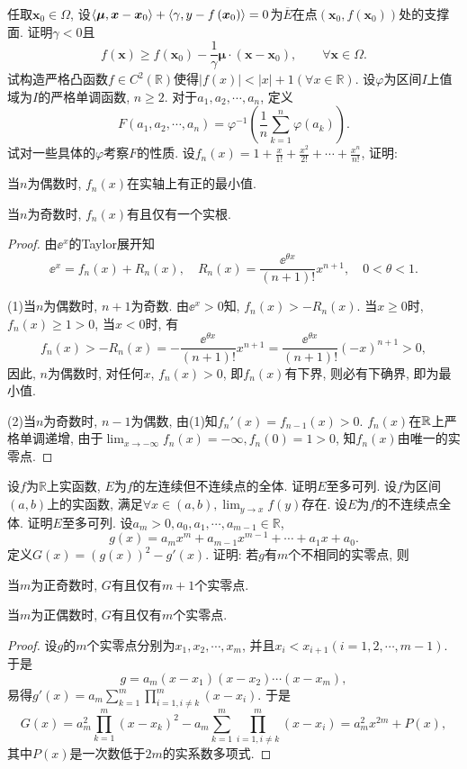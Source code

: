 \begin{quizb}
任取\(\boldsymbol{x}_0\in\varOmega\), 设\(\langle \boldsymbol{\mu},\boldsymbol{x}-\boldsymbol{x}_0 \rangle+\langle \gamma,y-f\left(\boldsymbol{x}_0\right) \rangle=0\)为\(\overline{E}\)在点\((\boldsymbol{x}_0,f\left(\boldsymbol{x}_0\right))\)处的支撑面. 证明\(\gamma<0\)且\[f\left(\boldsymbol{x}\right)\geqslant f\left(\boldsymbol{x}_0\right)-\frac{1}{\gamma}\boldsymbol{\mu}\cdot\left(\boldsymbol{x}-\boldsymbol{x}_0\right),\qquad\forall\boldsymbol{x}\in\varOmega.\]
\woe 试构造严格凸函数\(f\in C^2(\mathbb{R})\)使得\(\left|f(x)\right|<|x|+1\left(\forall x\in\mathbb{R}\right)\).
\woe 设\(\varphi\)为区间\(I\)上值域为\(I\)的严格单调函数, \(n\geqslant 2\). 对于\(a_1,a_2,\cdots,a_n\), 定义\[F(a_1,a_2,\cdots,a_n)=\varphi^{-1}\left(\frac{1}{n}\sum_{k=1}^{n}\varphi(a_k)\right).\]试对一些具体的\(\varphi\)考察\(F\)的性质.
\woe 设\(f_n(x)=1+\frac{x}{1!}+\frac{x^2}{2!}+\cdots+\frac{x^n}{n!}\), 证明:\begin{quizs}
\item 当\(n\)为偶数时, \(f_n(x)\)在实轴上有正的最小值.
\item 当\(n\)为奇数时, \(f_n(x)\)有且仅有一个实根.
\end{quizs}
\begin{proof}
由\(\ee^x\)的Taylor展开知\[\ee^x=f_n(x)+R_n(x),\quad R_n(x)=\frac{\ee^{\theta x}}{(n+1)!}x^{n+1},\quad 0<\theta<1.\]

(1)当\(n\)为偶数时, \(n+1\)为奇数. 由\(\ee^x>0\)知, \(f_n(x)>-R_n(x)\). 当\(x\geqslant 0\)时, \(f_n(x)\geqslant 1>0\), 当\(x<0\)时, 有\[f_n(x)>-R_n(x)=-\frac{\ee^{\theta x}}{(n+1)!}x^{n+1}=\frac{\ee^{\theta x}}{(n+1)!}(-x)^{n+1}>0,\]因此, \(n\)为偶数时, 对任何\(x\), \(f_n(x)>0\), 即\(f_n(x)\)有下界, 则必有下确界, 即为最小值.

(2)当\(n\)为奇数时, \(n-1\)为偶数, 由(1)知\(f_n'(x)=f_{n-1}(x)>0\). \(f_n(x)\)在\(\mathbb{R}\)上严格单调递增, 由于\(\lim_{x\rightarrow-\infty}f_n(x)=-\infty,f_n(0)=1>0\), 知\(f_n(x)\)由唯一的实零点.
\end{proof}
\woe 设\(f\)为\(\mathbb{R}\)上实函数, \(E\)为\(f\)的左连续但不连续点的全体. 证明\(E\)至多可列.
\woe 设\(f\)为区间\((a,b)\)上的实函数, 满足\(\forall x\in(a,b),\lim_{y\rightarrow x}f(y)\)存在. 设\(E\)为\(f\)的不连续点全体. 证明\(E\)至多可列.
\woe 设\(a_m>0,a_0,a_1,\cdots,a_{m-1}\in\mathbb{R}\),\[g(x)=a_mx^m+a_{m-1}x^{m-1}+\cdots+a_1x+a_0.\]定义\(G(x)=\left(g(x)\right)^2-g'(x)\). 证明: 若\(g\)有\(m\)个不相同的实零点, 则\begin{quizs}
\item 当\(m\)为正奇数时, \(G\)有且仅有\(m+1\)个实零点.
\item 当\(m\)为正偶数时, \(G\)有且仅有\(m\)个实零点.
\end{quizs}
\begin{proof}
设\(g\)的\(m\)个实零点分别为\(x_1,x_2,\cdots,x_m\),  并且\(x_i<x_{i+1}(i=1,2,\cdots,m-1)\). 于是\[g=a_m(x-x_1)(x-x_2)\cdots(x-x_m),\]易得\(g'(x)=a_m\sum_{k=1}^{m}\prod_{i=1,i\ne k}^{m}(x-x_i)\). 于是\[G(x)=a_m^2\prod_{k=1}^{m}(x-x_k)^2-a_m\sum_{k=1}^{m}\prod_{i=1,i\ne k}^{m}(x-x_i)=a_m^2x^{2m}+P(x),\]其中\(P(x)\)是一次数低于\(2m\)的实系数多项式.


\end{proof}
\end{quizb}
